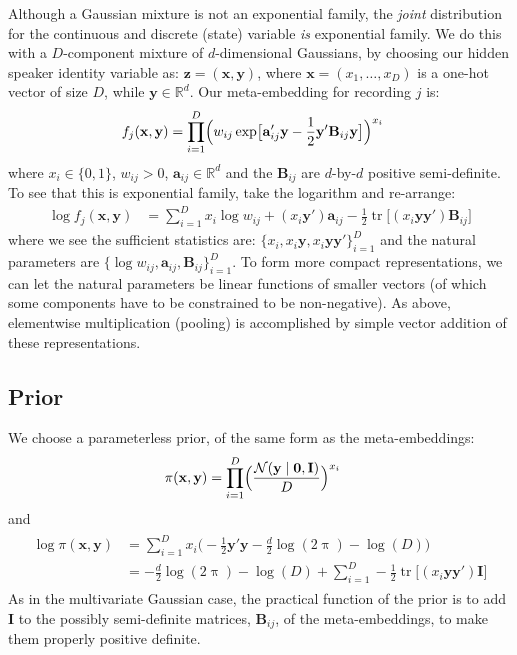 \documentclass[a4paper,oneside,12pt,english]{report}
\def\zvec{\mathbf{z}}
\def\ND{\mathcal{N}}
\DeclareMathOperator{\trace}{tr}
\def\R{\mathbb{R}}
\def\Bmat{\mathbf{B}}
\def\Imat{\mathbf{I}}
\def\yvec{\mathbf{y}}
\def\xvec{\mathbf{x}}
\def\avec{\mathbf{a}}
\def\nulvec{\boldsymbol{0}}
\begin{document}
Although a Gaussian mixture is not an exponential family, the \emph{joint} distribution for the continuous and discrete (state) variable \emph{is} exponential family. We do this with a $D$-component mixture of $d$-dimensional Gaussians, by choosing our hidden speaker identity variable as: $\zvec=(\xvec,\yvec)$, where $\xvec=(x_1,\ldots,x_D)$ is a one-hot vector of size $D$, while $\yvec\in\R^d$. Our meta-embedding for recording $j$ is:
\begin{align}
f_j(\xvec,\yvec) &= \prod_{i=1}^D \Bigl(w_{ij}\exp\bigl[\avec'_{ij}\yvec-\frac12\yvec'\Bmat_{ij}\yvec\bigr]\Bigr)^{x_i}
\end{align}
where $x_i\in\{0,1\}$, $w_{ij}>0$, $\avec_{ij}\in\R^d$ and the $\Bmat_{ij}$ are $d$-by-$d$ positive semi-definite. To see that this is exponential family, take the logarithm and re-arrange:
\begin{align}
\log f_j(\xvec,\yvec) &= \sum_{i=1}^D x_i\log w_{ij} + (x_i\yvec')\avec_{ij}-\frac12\trace\bigl[(x_i\yvec\yvec')\Bmat_{ij}\bigr]
\end{align}
where we see the sufficient statistics are: $\{x_i,x_i\yvec,x_i\yvec\yvec'\}_{i=1}^D$ and the natural parameters are $\{\log w_{ij},\avec_{ij},\Bmat_{ij}\}_{i=1}^D$. To form more compact representations, we can let the natural parameters be linear functions of smaller vectors (of which some components have to be constrained to be non-negative). As above, elementwise multiplication (pooling) is accomplished by simple vector addition of these representations. 

\subsection{Prior}
We choose a parameterless prior, of the same form as the meta-embeddings:
\begin{align}
\pi(\xvec,\yvec) &= \prod_{i=1}^D \Bigl(\frac{\ND(\yvec\mid\nulvec,\Imat)}{D}\Bigr)^{x_i}
\end{align} 
and
\begin{align}
\begin{split}
\log \pi(\xvec,\yvec) &= \sum_{i=1}^D x_i \bigl( -\frac12\yvec'\yvec -\frac{d}{2}\log(2\uppi) -\log(D)\bigr) \\
&= -\frac{d}{2}\log(2\uppi) -\log(D) + \sum_{i=1}^D -\frac12\trace\bigl[(x_i\yvec\yvec')\Imat\bigr]
\end{split}
\end{align}
As in the multivariate Gaussian case, the practical function of the prior is to add $\Imat$ to the possibly semi-definite matrices, $\Bmat_{ij}$, of the meta-embeddings, to make them properly positive definite. 
\end{document}
